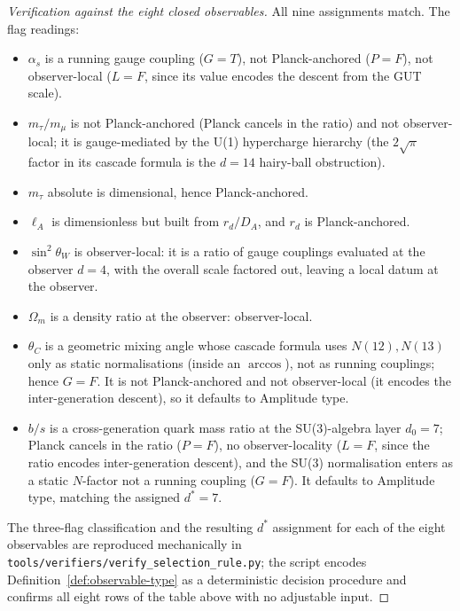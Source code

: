 \documentclass[12pt,a4paper]{article}
\begin{document}
\begin{proof}[Verification against the eight closed observables]
All nine assignments match. The flag readings:
\begin{itemize}
\item $\alpha_s$ is a running gauge coupling ($G=T$), not Planck-anchored ($P=F$), not observer-local ($L=F$, since its value encodes the descent from the GUT scale).
\item $m_\tau/m_\mu$ is not Planck-anchored (Planck cancels in the ratio) and not observer-local; it is gauge-mediated by the U(1) hypercharge hierarchy (the $2\sqrt\pi$ factor in its cascade formula is the $d=14$ hairy-ball obstruction).
\item $m_\tau$ absolute is dimensional, hence Planck-anchored.
\item $\ell_A$ is dimensionless but built from $r_d/D_A$, and $r_d$ is Planck-anchored.
\item $\sin^2\theta_W$ is observer-local: it is a ratio of gauge couplings evaluated at the observer $d=4$, with the overall scale factored out, leaving a local datum at the observer.
\item $\Omega_m$ is a density ratio at the observer: observer-local.
\item $\theta_C$ is a geometric mixing angle whose cascade formula uses $N(12),N(13)$ only as static normalisations (inside an $\arccos$), not as running couplings; hence $G=F$. It is not Planck-anchored and not observer-local (it encodes the inter-generation descent), so it defaults to Amplitude type.
\item $b/s$ is a cross-generation quark mass ratio at the SU(3)-algebra layer $d_0=7$; Planck cancels in the ratio ($P=F$), no observer-locality ($L=F$, since the ratio encodes inter-generation descent), and the SU(3) normalisation enters as a static $N$-factor not a running coupling ($G=F$). It defaults to Amplitude type, matching the assigned $d^*=7$.
\end{itemize}
The three-flag classification and the resulting $d^*$ assignment for each of the eight observables are reproduced mechanically in \texttt{tools/verifiers/verify\_selection\_rule.py}; the script encodes Definition~\ref{def:observable-type} as a deterministic decision procedure and confirms all eight rows of the table above with no adjustable input.
\end{proof}
\end{document}
